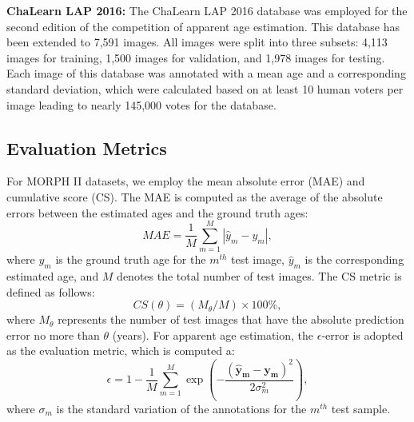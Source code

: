 \documentclass[journal,twoside]{IEEEtran}
\begin{document}
\textbf{ChaLearn LAP 2016:} The ChaLearn LAP 2016 database \cite{escalera2016chalearn} was employed for the second edition of the competition of apparent age estimation. This database has been extended to 7,591 images. All images were split into three subsets: 4,113 images for training, 1,500 images for validation, and 1,978 images for testing. Each image of this database was annotated with a mean age and a corresponding standard deviation, which were calculated based on at least 10 human voters per image leading to nearly 145,000 votes for the database.

\subsection{Evaluation Metrics}
For MORPH II datasets, we employ the mean absolute error (MAE) and cumulative score (CS). The MAE is computed as the average of the absolute errors between the estimated ages and the ground truth ages:
\begin{equation}
MAE =  \frac{1}{M} \sum_{m=1}^{M} |\hat{y}_m - y_m|,
\label{equ:MAE}
\end{equation}
where $y_m$ is the ground truth age for the $m^{th}$ test image, $\hat{y}_m$ is the corresponding estimated age, and $M$ denotes the total number of test images. The CS metric is defined as follows:
\begin{equation}
CS(\theta) = (M_{\theta} /  M) \times 100\%,
\label{equ:CS}
\end{equation}
where $M_{\theta}$ represents the number of test images that have the absolute prediction error no more than $\theta$ (years). For apparent age estimation, the $\epsilon$-error is adopted as the evaluation metric, which is computed a:
\begin{equation}
\epsilon = 1 - \frac{1}{M} \sum_{m=1}^M \exp (- \frac{(\bm{\hat{y}_m - y_m} )^2}{2 \sigma_m^2}),
\label{equ:error}
\end{equation}
where $\sigma_m$ is the standard variation of the annotations for the $m^{th}$ test sample.
\end{document}
